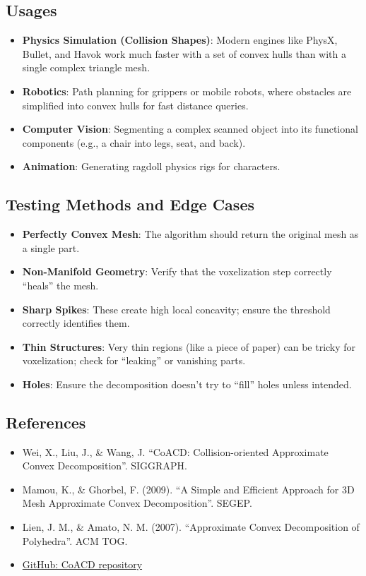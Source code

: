 \subsection{Usages}
\begin{itemize}
\item \textbf{Physics Simulation (Collision Shapes)}: Modern engines like PhysX, Bullet, and Havok work much faster with a set of convex hulls than with a single complex triangle mesh.
\item \textbf{Robotics}: Path planning for grippers or mobile robots, where obstacles are simplified into convex hulls for fast distance queries.
\item \textbf{Computer Vision}: Segmenting a complex scanned object into its functional components (e.g., a chair into legs, seat, and back).
\item \textbf{Animation}: Generating ragdoll physics rigs for characters.
\end{itemize}

\subsection{Testing Methods and Edge Cases}
\begin{itemize}
\item \textbf{Perfectly Convex Mesh}: The algorithm should return the original mesh as a single part.
\item \textbf{Non-Manifold Geometry}: Verify that the voxelization step correctly ``heals'' the mesh.
\item \textbf{Sharp Spikes}: These create high local concavity; ensure the threshold correctly identifies them.
\item \textbf{Thin Structures}: Very thin regions (like a piece of paper) can be tricky for voxelization; check for ``leaking'' or vanishing parts.
\item \textbf{Holes}: Ensure the decomposition doesn't try to ``fill'' holes unless intended.
\end{itemize}

\subsection{References}
\begin{itemize}
\item Wei, X., Liu, J., \& Wang, J. \cite{wei2022} ``CoACD: Collision-oriented Approximate Convex Decomposition''. SIGGRAPH.
\item Mamou, K., \& Ghorbel, F. (2009). ``A Simple and Efficient Approach for 3D Mesh Approximate Convex Decomposition''. SEGEP.
\item Lien, J. M., \& Amato, N. M. (2007). ``Approximate Convex Decomposition of Polyhedra''. ACM TOG.
\item \href{https://github.com/Sarah-Wei/CoACD}{GitHub: CoACD repository}
\end{itemize}

